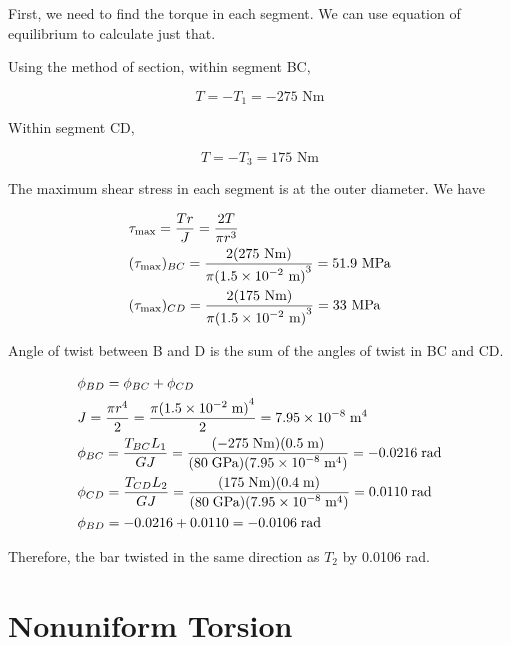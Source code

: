 \documentclass[
10pt,
a4paper,
openany,
svgnames,
]{book} %
\begin{document}
\begin{solution}
First, we need to find the torque in each segment. We can use equation of equilibrium to calculate just that.

Using the method of section, within segment BC,

$$T =  - {T_1} =  - 275\text{ Nm}$$

Within segment CD,

\[T =  - {T_3} = 175\text{ Nm}\]

The maximum shear stress in each segment is at the outer diameter. We have

\[\begin{gathered}
  {\tau _{\max }} = \frac{{Tr}}{{{J}}} = \frac{{2T}}{{\pi {r^3}}} \hfill \\
  {({\tau _{\max }})_{BC}} = \frac{{2(275\text{ Nm})}}{{\pi {{(1.5 \times {{10}^{ - 2}}\text{ m})}^3}}} = 51.9\text{ MPa} \hfill \\
  {({\tau _{\max }})_{CD}} = \frac{{2(175\text{ Nm})}}{{\pi {{(1.5 \times {{10}^{ - 2}}\text{ m})}^3}}} = 33\text{ MPa} \hfill \\ 
\end{gathered} \]

Angle of twist between B and D is the sum of the angles of twist in BC and CD.

\[\begin{gathered}
  {\phi _{BD}} = {\phi _{BC}} + {\phi _{CD}} \hfill \\
  {J} = \frac{{\pi {r^4}}}{2} = \frac{{\pi {{(1.5 \times {{10}^{ - 2}}\;{\text{m}})}^4}}}{2} = 7.95 \times {10^{ - 8}}\;{{\text{m}}^{\text{4}}} \hfill \\
  {\phi _{BC}} = \frac{{{T_{BC}}{L_1}}}{{G{J}}} = \frac{{( - 275\;{\text{Nm}})(0.5\;{\text{m}})}}{{(80\;{\text{GPa}})(7.95 \times {{10}^{ - 8}}\;{{\text{m}}^{\text{4}}})}} =  - 0.0216\;{\text{rad}} \hfill \\
  {\phi _{CD}} = \frac{{{T_{CD}}{L_2}}}{{G{J}}} = \frac{{(175\;{\text{Nm}})(0.4\;{\text{m}})}}{{(80\;{\text{GPa}})(7.95 \times {{10}^{ - 8}}\;{{\text{m}}^{\text{4}}})}} = 0.0110\;{\text{rad}} \hfill \\
  {\phi _{BD}} =  - 0.0216 + 0.0110 =  - 0.0106\;{\text{rad}} \hfill \\ 
\end{gathered} \]

Therefore, the bar twisted in the same direction as $T_2$ by 0.0106 rad.
\end{solution}

\section{Nonuniform Torsion}
\end{document}

